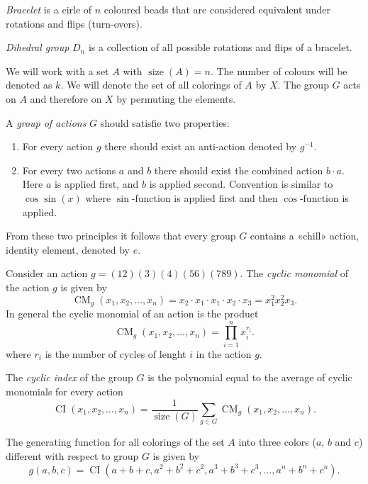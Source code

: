 \documentclass[12pt]{article}
\DeclareMathOperator{\size}{size}
\DeclareMathOperator{\CM}{CM}
\DeclareMathOperator{\CI}{CI}
\begin{document}
\begin{definition}
    \emph{Bracelet} is a cirle of $n$ coloured beads that are considered equivalent under rotations and flips (turn-overs). 

    \emph{Dihedral group} $D_n$ is a collection of all possible rotations and flips of a bracelet.
\end{definition}


We will work with a set $A$ with $\size(A) = n$. 
The number of colours will be denoted as $k$. 
We will denote the set of all colorings of $A$ by $X$. 
The group $G$ acts on $A$ and therefore on $X$ by permuting the elements.

\begin{definition}
    A \emph{group of actions} $G$ should satisfie two properties:
    \begin{enumerate}
        \item For every action $g$ there should exist an anti-action denoted by $g^{-1}$.
        \item For every two actions $a$ and $b$ there should exist the combined action $b\cdot a$. 
        Here $a$ is applied first, and $b$ is applied second. Convention is similar to $\cos \sin(x)$ where $\sin$-function is applied first and then $\cos$-function is applied.
    \end{enumerate}
    From these two principles it follows that every group $G$ contains a «chill» action, identity element, denoted by $e$. 
\end{definition}

\begin{definition}
    Consider an action $g = (12)(3)(4)(56)(789)$. The \emph{cyclic monomial} of the action $g$ is given by
    \[
    \CM_g(x_1, x_2, \dots, x_n) = x_2 \cdot x_1 \cdot x_1 \cdot x_2 \cdot x_3 = x_1^2 x_2^2 x_3.
    \]
    In general the cyclic monomial of an action is the product 
    \[
    \CM_g(x_1, x_2, \dots, x_n) = \prod_{i=1}^n x_i^{r_i}.
    \]
    where $r_i$ is the number of cycles of lenght $i$ in the action $g$.
\end{definition}

\begin{definition}
    The \emph{cyclic index} of the group $G$ is the polynomial equal to the average of cyclic monomials for every action
    \[
    \CI(x_1, x_2, \ldots, x_n) = \frac{1}{\size(G)} \sum_{g\in G} \CM_g(x_1, x_2, \dots, x_n).
    \]
\end{definition}


\begin{theorem}
    The generating function for all colorings of the set $A$ into three colors ($a$, $b$ and $c$) different with respect to group $G$ is given by
    \[
    g(a, b, c) = \CI(a + b + c, a^2 + b^2 + c^2, a^3 + b^3 + c^3, \dots, a^n + b^n + c^n).
    \]
\end{theorem}
\end{document}
